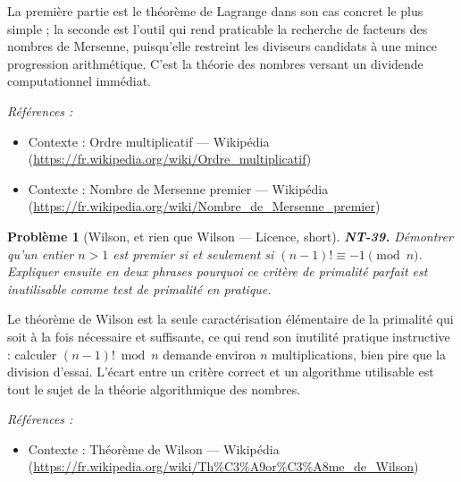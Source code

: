 \documentclass[11pt]{article}
\newtheorem{problem}{Problème}
\newenvironment{refs}{\par\small\noindent\emph{Références :}\begin{itemize}\setlength\itemsep{0pt}}{\end{itemize}\normalsize}
\begin{document}
\noindent La première partie est le théorème de Lagrange dans son cas concret le plus simple ; la seconde est l'outil qui rend praticable la recherche de facteurs des nombres de Mersenne, puisqu'elle restreint les diviseurs candidats à une mince progression arithmétique. C'est la théorie des nombres versant un dividende computationnel immédiat.

\begin{refs}
\item Contexte : Ordre multiplicatif --- Wikipédia (\url{https://fr.wikipedia.org/wiki/Ordre_multiplicatif})
\item Contexte : Nombre de Mersenne premier --- Wikipédia (\url{https://fr.wikipedia.org/wiki/Nombre_de_Mersenne_premier})
\end{refs}

\bigskip

\begin{problem}[{Wilson, et rien que Wilson --- Licence, short}]
\textbf{NT-39.} Démontrer qu'un entier $ n > 1 $ est premier si et seulement si $ (n-1)! \equiv -1 \pmod n $. Expliquer ensuite en deux phrases pourquoi ce critère de primalité parfait est inutilisable comme test de primalité en pratique.
\end{problem}

\noindent Le théorème de Wilson est la seule caractérisation élémentaire de la primalité qui soit à la fois nécessaire et suffisante, ce qui rend son inutilité pratique instructive : calculer $ (n-1)! \bmod n $ demande environ $ n $ multiplications, bien pire que la division d'essai. L'écart entre un critère correct et un algorithme utilisable est tout le sujet de la théorie algorithmique des nombres.

\begin{refs}
\item Contexte : Théorème de Wilson --- Wikipédia (\url{https://fr.wikipedia.org/wiki/Th%C3%A9or%C3%A8me_de_Wilson})
\end{refs}

\bigskip
\end{document}
